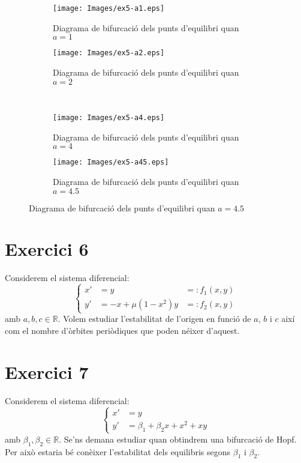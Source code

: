 \documentclass[a4paper]{article}
\newcommand{\RR}{\ensuremath{\mathbb{R}}} %
\theoremstyle{definition}
\begin{document}
\begin{figure}[ht]
  \captionsetup[subfigure]{justification=centering}
  \centering
  \begin{subfigure}[b]{0.4\linewidth}
    \centering
    \texttt{[image: Images/ex5-a1.eps]}
    \caption{Diagrama de bifurcació dels punts d'equilibri quan $a=1$}
  \end{subfigure}
  \hfill
  \begin{subfigure}[b]{0.4\linewidth}
    \centering
    \texttt{[image: Images/ex5-a2.eps]}
    \caption{Diagrama de bifurcació dels punts d'equilibri quan $a=2$}
    \label{fig2}
  \end{subfigure}
  \\
  \centering
  \begin{subfigure}[b]{0.4\linewidth}
    \centering
    \texttt{[image: Images/ex5-a4.eps]}
    \caption{Diagrama de bifurcació dels punts d'equilibri quan $a=4$}
  \end{subfigure}
  \hfill
  \begin{subfigure}[b]{0.4\linewidth}
    \centering
    \texttt{[image: Images/ex5-a45.eps]}
    \caption{Diagrama de bifurcació dels punts d'equilibri quan $a=4.5$}
  \end{subfigure}
\end{figure}
\section*{Exercici 6}
Considerem el sistema diferencial:
\begin{equation}\label{sis6}
  \left\{
  \begin{aligned}
    x' & =y                & =:  f_1(x,y) \\
    y' & =-x + \mu(1-x^2)y & =: f_2(x,y)
  \end{aligned}
  \right.
\end{equation}
amb $a,b,c\in\RR$. Volem estudiar l'estabilitat de l'origen en funció de $a$, $b$ i $c$ així com el nombre d'òrbites periòdiques que poden néixer d'aquest.
\section*{Exercici 7}
Considerem el sistema diferencial:
\begin{equation}\label{sis7}
  \left\{
  \begin{aligned}
    x' & =y                          \\
    y' & =\beta_1+\beta_2x + x^2 +xy
  \end{aligned}
  \right.
\end{equation}
amb $\beta_1,\beta_2\in\RR$. Se'ns demana estudiar quan obtindrem una bifurcació de Hopf. Per això estaria bé conèixer l'estabilitat dels equilibris segons $\beta_1$ i $\beta_2$.
\end{document}

